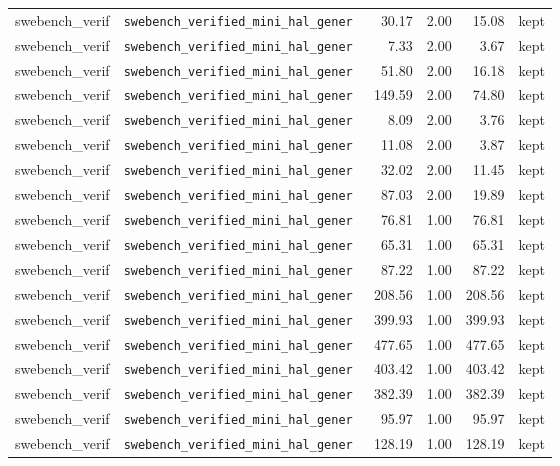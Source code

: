 {\begin{longtable}{llrrrl}
swebench\_verif & \texttt{\scriptsize swebench\_verified\_mini\_hal\_gener~} & 30.17 & 2.00 & 15.08 & kept \\
swebench\_verif & \texttt{\scriptsize swebench\_verified\_mini\_hal\_gener~} & 7.33 & 2.00 & 3.67 & kept \\
swebench\_verif & \texttt{\scriptsize swebench\_verified\_mini\_hal\_gener~} & 51.80 & 2.00 & 16.18 & kept \\
swebench\_verif & \texttt{\scriptsize swebench\_verified\_mini\_hal\_gener~} & 149.59 & 2.00 & 74.80 & kept \\
swebench\_verif & \texttt{\scriptsize swebench\_verified\_mini\_hal\_gener~} & 8.09 & 2.00 & 3.76 & kept \\
swebench\_verif & \texttt{\scriptsize swebench\_verified\_mini\_hal\_gener~} & 11.08 & 2.00 & 3.87 & kept \\
swebench\_verif & \texttt{\scriptsize swebench\_verified\_mini\_hal\_gener~} & 32.02 & 2.00 & 11.45 & kept \\
swebench\_verif & \texttt{\scriptsize swebench\_verified\_mini\_hal\_gener~} & 87.03 & 2.00 & 19.89 & kept \\
swebench\_verif & \texttt{\scriptsize swebench\_verified\_mini\_hal\_gener~} & 76.81 & 1.00 & 76.81 & kept \\
swebench\_verif & \texttt{\scriptsize swebench\_verified\_mini\_hal\_gener~} & 65.31 & 1.00 & 65.31 & kept \\
swebench\_verif & \texttt{\scriptsize swebench\_verified\_mini\_hal\_gener~} & 87.22 & 1.00 & 87.22 & kept \\
swebench\_verif & \texttt{\scriptsize swebench\_verified\_mini\_hal\_gener~} & 208.56 & 1.00 & 208.56 & kept \\
swebench\_verif & \texttt{\scriptsize swebench\_verified\_mini\_hal\_gener~} & 399.93 & 1.00 & 399.93 & kept \\
swebench\_verif & \texttt{\scriptsize swebench\_verified\_mini\_hal\_gener~} & 477.65 & 1.00 & 477.65 & kept \\
swebench\_verif & \texttt{\scriptsize swebench\_verified\_mini\_hal\_gener~} & 403.42 & 1.00 & 403.42 & kept \\
swebench\_verif & \texttt{\scriptsize swebench\_verified\_mini\_hal\_gener~} & 382.39 & 1.00 & 382.39 & kept \\
swebench\_verif & \texttt{\scriptsize swebench\_verified\_mini\_hal\_gener~} & 95.97 & 1.00 & 95.97 & kept \\
swebench\_verif & \texttt{\scriptsize swebench\_verified\_mini\_hal\_gener~} & 128.19 & 1.00 & 128.19 & kept \\

\end{longtable}}
